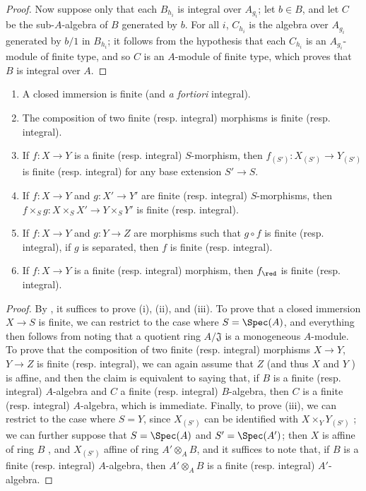 \begin{proof}
Now suppose only that each $B_{h_i}$ is integral over $A_{g_i}$;
let $b\in B$, and let $C$ be the sub-$A$-algebra of $B$ generated by $b$.
For all $i$, $C_{h_i}$ is the algebra over $A_{g_i}$ generated by $b/1$ in $B_{h_i}$;
it follows from the hypothesis that each $C_{h_i}$ is an $A_{g_i}$-module of finite type, and so  $C$ is an $A$-module of finite type, which proves that $B$ is integral over $A$.
\end{proof}

\begin{proposition}[6.1.5]
\label{II.6.1.5}
\medskip\noindent
\begin{enumerate}
  \item[(i)] A closed immersion is finite (and \emph{a fortiori} integral).
  \item[(ii)] The composition of two finite (resp. integral) morphisms is finite (resp. integral).
  \item[(iii)] If $f:X\to Y$ is a finite (resp. integral) $S$-morphism, then $f_{(S')}:X_{(S')}\to Y_{(S')}$ is finite (resp. integral) for any base extension $S'\to S$.
  \item[(iv)] If $f:X\to Y$ and $g:X'\to Y'$ are finite (resp. integral) $S$-morphisms, then $f\times_S g:X\times_S X'\to Y\times_S Y'$ is finite (resp. integral).
  \item[(v)] If $f:X\to Y$ and $g:Y\to Z$ are morphisms such that $g\circ f$ is finite (resp. integral), if $g$ is separated, then $f$ is finite (resp. integral).
  \item[(vi)] If $f:X\to Y$ is a finite (resp. integral) morphism, then $f_\red$ is finite (resp. integral).
\end{enumerate}
\end{proposition}

\begin{proof}
By , it suffices to prove (i), (ii), and (iii).
To prove that a closed immersion $X\to S$ is finite, we can restrict to the case where $S=\Spec(A)$, and everything then follows from noting that a quotient ring $A/\mathfrak{J}$ is a monogeneous $A$-module.
To prove that the composition of two finite (resp. integral) morphisms $X\to Y$, $Y\to Z$ is finite (resp. integral), we can again assume that $Z$ (and thus $X$ and $Y$ ) is affine, and then the claim is equivalent to saying that, if $B$ is a finite (resp. integral) $A$-algebra and $C$ a finite (resp. integral) $B$-algebra, then $C$ is a finite (resp. integral) $A$-algebra, which is immediate.
Finally, to prove (iii), we can restrict to the case where $S=Y$, since $X_{(S')}$ can be identified with $X\times_Y Y_{(S')}$ ;
we can further suppose that $S=\Spec(A)$ and $S'=\Spec(A')$;
then $X$ is affine of ring $B$ , and $X_{(S')}$ affine of ring $A'\otimes_A B$, and it suffices to note that, if $B$ is a finite (resp. integral) $A$-algebra, then $A'\otimes_A B$ is a finite (resp. integral) $A'$-algebra.
\end{proof}

